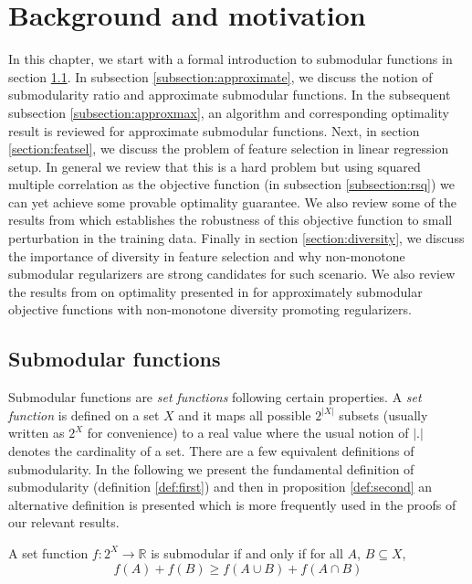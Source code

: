 \chapter{Background and motivation}
\label{chapter:background}
In this chapter, we start with a formal introduction to submodular functions in section \ref{section:submodular}. In subsection \ref{subsection:approximate}, we discuss the notion of submodularity ratio and approximate submodular functions. In the subsequent subsection \ref{subsection:approxmax}, an algorithm and corresponding optimality result is reviewed for approximate submodular functions. Next, in section \ref{section:featsel}, we discuss the problem of feature selection in linear regression setup. In general we review that this is a hard problem but using squared multiple correlation as the objective function (in subsection \ref{subsection:rsq}) we can yet achieve some provable optimality guarantee. We also review some of the results from \citealp{Das:2008:ASS:1374376.1374384} which establishes the robustness of this objective function to small perturbation in the training data. Finally in section \ref{section:diversity}, we discuss the importance of diversity in feature selection and why non-monotone submodular regularizers are strong candidates for such scenario. We also review the results from on optimality presented in \citealp{NIPS2012_4689} for approximately submodular objective functions with non-monotone diversity promoting regularizers.

\section{Submodular functions}
\label{section:submodular}
Submodular functions are \emph{set functions} following certain properties. A \emph{set function} is defined on a set $X$ and it maps all possible $2^{|X|}$ subsets (usually written as $2^X$ for convenience) to a real value where the usual notion of $|.|$ denotes the cardinality of a set. There are a few equivalent definitions of submodularity. In the following we present the fundamental definition of submodularity (definition \ref{def:first}) and then in proposition \ref{def:second} an alternative definition is presented which is more frequently used in the proofs of our relevant results.

\begin{definition}
\label{def:first}
 A set function $f:2^X\rightarrow \mathbb{R}$ is submodular if and only if for all $A$, $B\subseteq X$, \[f(A)+f(B)\geq f(A\cup B)+f(A\cap B)\]
\end{definition}

